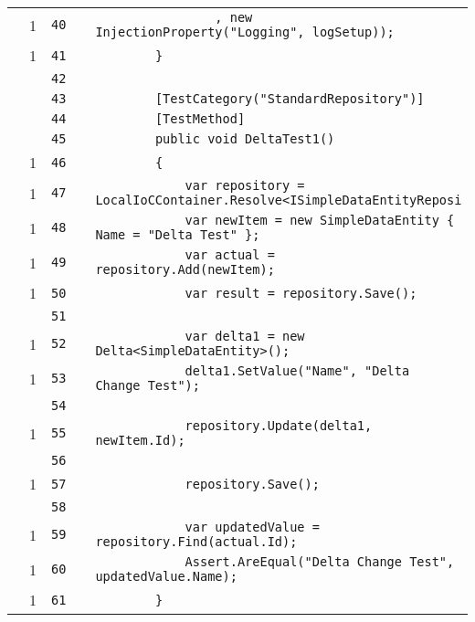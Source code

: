 \documentclass[a4paper,10pt]{article}
\begin{document}
\begin{longtable}[l]{lrrll}
\cellcolor{green} & 1 & \verb~40~ & & \verb~                , new InjectionProperty("Logging", logSetup));~\\
\cellcolor{green} & 1 & \verb~41~ & & \verb~        }~\\
\cellcolor{gray} &  & \verb~42~ & & \verb~~\\
\cellcolor{gray} &  & \verb~43~ & & \verb~        [TestCategory("StandardRepository")]~\\
\cellcolor{gray} &  & \verb~44~ & & \verb~        [TestMethod]~\\
\cellcolor{gray} &  & \verb~45~ & & \verb~        public void DeltaTest1()~\\
\cellcolor{green} & 1 & \verb~46~ & & \verb~        {~\\
\cellcolor{green} & 1 & \verb~47~ & & \verb~            var repository = LocalIoCContainer.Resolve<ISimpleDataEntityReposi~\\
\cellcolor{green} & 1 & \verb~48~ & & \verb~            var newItem = new SimpleDataEntity { Name = "Delta Test" };~\\
\cellcolor{green} & 1 & \verb~49~ & & \verb~            var actual = repository.Add(newItem);~\\
\cellcolor{green} & 1 & \verb~50~ & & \verb~            var result = repository.Save();~\\
\cellcolor{gray} &  & \verb~51~ & & \verb~~\\
\cellcolor{green} & 1 & \verb~52~ & & \verb~            var delta1 = new Delta<SimpleDataEntity>();~\\
\cellcolor{green} & 1 & \verb~53~ & & \verb~            delta1.SetValue("Name", "Delta Change Test");~\\
\cellcolor{gray} &  & \verb~54~ & & \verb~~\\
\cellcolor{green} & 1 & \verb~55~ & & \verb~            repository.Update(delta1, newItem.Id);~\\
\cellcolor{gray} &  & \verb~56~ & & \verb~~\\
\cellcolor{green} & 1 & \verb~57~ & & \verb~            repository.Save();~\\
\cellcolor{gray} &  & \verb~58~ & & \verb~~\\
\cellcolor{green} & 1 & \verb~59~ & & \verb~            var updatedValue = repository.Find(actual.Id);~\\
\cellcolor{green} & 1 & \verb~60~ & & \verb~            Assert.AreEqual("Delta Change Test", updatedValue.Name);~\\
\cellcolor{green} & 1 & \verb~61~ & & \verb~        }~\\

\end{longtable}
\end{document}
